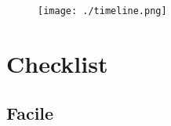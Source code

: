 \blandscape
\begin{figure}[H]
\centering
\texttt{[image: ./timeline.png]}
\label{timeline}
\end{figure}
\elandscape
\newpage

\hypertarget{checklist}{%
\section*{Checklist}\label{checklist}}

\hypertarget{facile}{%
\subsection*{Facile}\label{facile}}

